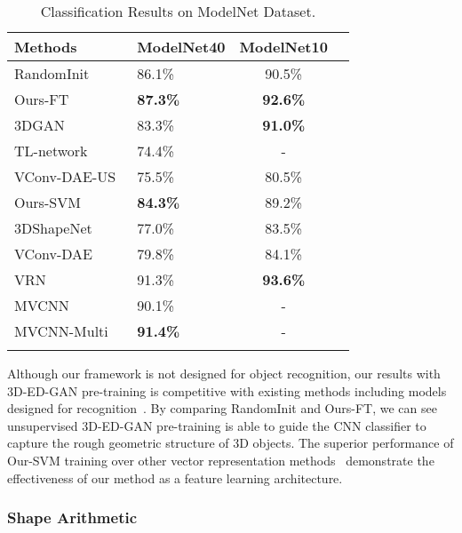 \documentclass[10pt,twocolumn,letterpaper]{article}
\begin{document}
\begin{table}
\begin{center}
\setlength{\tabcolsep}{0.1em}
\begin{tabular}{llcc}
\Xhline{3\arrayrulewidth}
Methods&ModelNet40&ModelNet10\\
\hline
RandomInit&86.1\%&90.5\%\\
Ours-FT&\textbf{87.3\%}&\textbf{92.6\%}\\
\hline
3DGAN~\cite{3dgan}&83.3\%&\textbf{91.0\%}\\
TL-network~\cite{tl}&74.4\%&-\\
VConv-DAE-US~\cite{vconvdae}&75.5\%&80.5\%\\
Ours-SVM&\textbf{84.3\%}&89.2\%\\
\hline
3DShapeNet~\cite{shapenet}&77.0\%&83.5\%\\
VConv-DAE~\cite{vconvdae}&79.8\%&84.1\%\\
VRN~\cite{generativediscriminative}&91.3\%&\textbf{93.6\%}\\
MVCNN~\cite{sumultiview}&90.1\%&-\\
MVCNN-Multi\cite{qimultiview}&\textbf{91.4\%}&-\\
\Xhline{3\arrayrulewidth}
\end{tabular}
\end{center}
\caption{Classification Results on ModelNet Dataset.}
\label{table:classification}
\end{table}

Although our framework is not designed for object recognition, our results with 3D-ED-GAN pre-training is competitive with existing methods including models designed for recognition~\cite{generativediscriminative,sumultiview}. By comparing RandomInit and Ours-FT, we can see unsupervised 3D-ED-GAN pre-training is able to guide the CNN classifier to capture the rough geometric structure of 3D objects. The superior performance of Our-SVM training over other vector representation methods~\cite{tl,3dgan,vconvdae} demonstrate the effectiveness of our method as a feature learning architecture.


\subsubsection{Shape Arithmetic}
\end{document}
